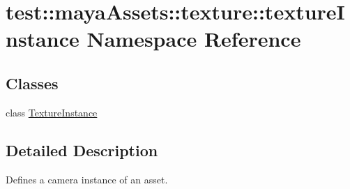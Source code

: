 \hypertarget{namespacetest_1_1mayaAssets_1_1texture_1_1textureInstance}{\section{test\-:\-:maya\-Assets\-:\-:texture\-:\-:texture\-Instance \-Namespace \-Reference}
\label{d9/d52/namespacetest_1_1mayaAssets_1_1texture_1_1textureInstance}
}
\subsection*{\-Classes}
\begin{DoxyCompactItemize}
\item 
class \hyperlink{classtest_1_1mayaAssets_1_1texture_1_1textureInstance_1_1TextureInstance}{\-Texture\-Instance}
\end{DoxyCompactItemize}


\subsection{\-Detailed \-Description}
\begin{DoxyVerb}
Defines a camera instance of an asset.
\end{DoxyVerb}
 